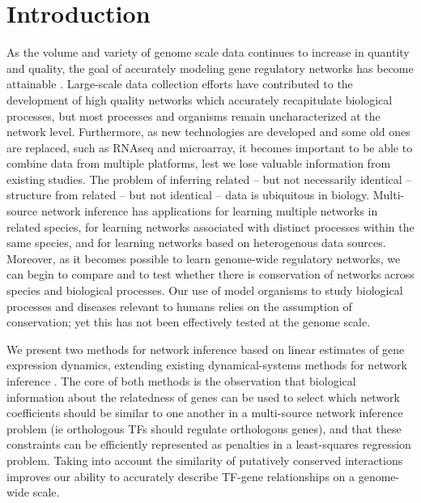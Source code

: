 \documentclass[11pt]{article}
\begin{document}
\section{Introduction}
As the volume and variety of genome scale data continues to increase in quantity and quality, the goal of accurately modeling gene regulatory networks has become attainable \cite{bonneau_predictive_2007, ciofani_validated_2012, carro_transcriptional_2010}. 
Large-scale data collection efforts have contributed to the development of high quality networks which accurately recapitulate biological processes, but most processes and organisms remain uncharacterized at the network level. 
Furthermore, as new technologies are developed and some old ones are replaced, such as RNAseq and microarray, it becomes important to be able to combine data from multiple platforms, lest we lose valuable information from existing studies. The problem of inferring related -- but not necessarily identical -- structure from related -- but not identical -- data is ubiquitous in biology. 
Multi-source network inference has applications for learning multiple networks in related species, for learning networks associated with distinct processes within the same species, and for learning networks based on heterogenous data sources. 
Moreover, as it becomes possible to learn genome-wide regulatory networks, we can begin to compare and to test whether there is conservation of networks across species and biological processes. 
Our use of model organisms to study biological processes and diseases relevant to humans relies on the assumption of conservation; yet this has not been effectively tested at the genome scale. 

We present two methods for network inference based on linear estimates of gene expression dynamics, extending existing dynamical-systems methods for network inference \cite{bonneau_predictive_2007, arrieta-ortiz_experimentally_2015, yeung_reverse_2002}. 
The core of both methods is the observation that biological information about the relatedness of genes can be used to select which network coefficients should be similar to one another in a multi-source network inference problem (ie orthologous TFs should regulate orthologous genes), and that these constraints can be efficiently represented as penalties in a least-squares regression problem. 
Taking into account the similarity of putatively conserved interactions improves our ability to accurately describe TF-gene relationships on a genome-wide scale.  
\end{document}
